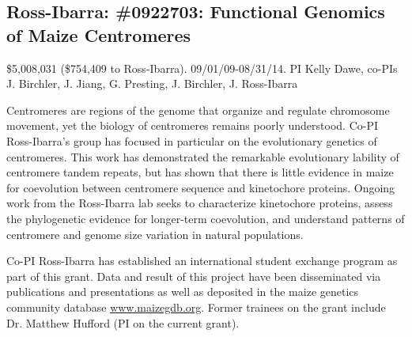 \subsection*{Ross-Ibarra: \#0922703: Functional Genomics of Maize Centromeres}
\$5,008,031 (\$754,409 to Ross-Ibarra). 09/01/09-08/31/14. PI Kelly Dawe, co-PIs J. Birchler, J. Jiang, G. Presting, J. Birchler, J. Ross-Ibarra
\par{} Centromeres are regions of the genome that organize and regulate chromosome movement, yet the biology of centromeres remains poorly understood. Co-PI Ross-Ibarra's group has focused in particular on the evolutionary genetics of centromeres. This work has demonstrated the remarkable evolutionary lability of centromere tandem repeats, but has shown that there is little evidence in maize for coevolution between centromere sequence and kinetochore proteins. Ongoing work from the Ross-Ibarra lab seeks to characterize kinetochore proteins, assess the phylogenetic evidence for longer-term coevolution, and understand patterns of centromere and genome size variation in natural populations.
\par{}  Co-PI Ross-Ibarra has established an international student exchange program as part of this grant. Data and result of this project have been disseminated via publications and presentations as well as deposited in the maize genetics community database \url{www.maizegdb.org}. Former trainees on the grant include Dr. Matthew Hufford (PI on the current grant).\
\par{} \citet{Shi2010a, Chia2012a, Fang2012, Hufford2012, Hufford2012b, Hufford2013, Melters2013a, Kanizay2013, Pyhajarvi2013}

